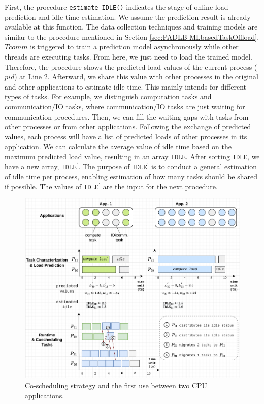 First, the procedure \texttt{estimate\_IDLE()} indicates the stage of online load prediction and idle-time estimation. We assume the prediction result is already available at this function. The data collection techniques and training models are similar to the procedure mentioned in Section \ref{sec:PADLB-MLbasedTaskOffload}. $Tcomm$ is triggered to train a prediction model asynchronously while other threads are executing tasks. From here, we just need to load the trained model. Therefore, the procedure shows the predicted load values of the current process ($pid$) at Line $2$. Afterward, we share this value with other processes in the original and other applications to estimate idle time. This mainly intends for different types of tasks. For example, we distinguish computation tasks and communication/IO tasks, where communication/IO tasks are just waiting for communication procedures. Then, we can fill the waiting gaps with tasks from other processes or from other applications. Following the exchange of predicted values, each process will have a list of predicted loads of other processes in its application. We can calculate the average value of idle time based on the maximum predicted load value, resulting in an array $\texttt{IDLE}$. After sorting $\texttt{IDLE}$, we have a new array, $\texttt{IDLE}^{'}$. The purpose of $\texttt{IDLE}^{'}$ is to conduct a general estimation of idle time per process, enabling estimation of how many tasks should be shared if possible. The values of $\texttt{IDLE}^{'}$ are the input for the next procedure.\\

\begin{figure}[t]
	\centering
	\includegraphics[scale=0.8]{./pictures/padlb_approach/padlb_coscheduling_idea_and_first_usecase.pdf}
	\caption{Co-scheduling strategy and the first use between two CPU applications.}
	\label{fig:proact_coschedule_task_and_first_usecase}
\end{figure}

